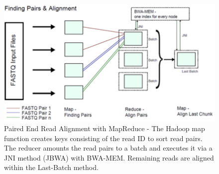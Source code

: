 \begin{figure}[!ht]
    \centering
    \includegraphics[width=1\textwidth]{images/mapreduce.png}
    \caption[Paired End Read Alignment with MapReduce]{Paired End Read Alignment with MapReduce - The Hadoop map function creates keys consisting of the read ID to sort read pairs. The reducer amounts the read pairs to a batch and executes it via a JNI method (JBWA) with BWA-MEM. Remaining reads are aligned within the Last-Batch method.  }
    \label{fig:mapreduce}
\end{figure}

